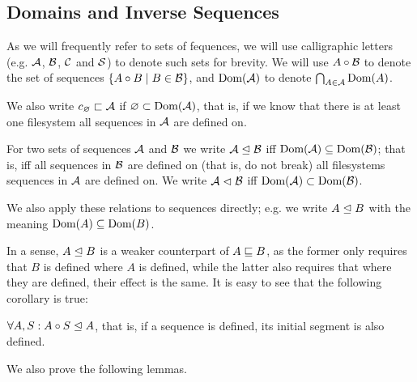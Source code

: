 

\subsection{Domains and Inverse Sequences}

\begin{mydef}
As we will frequently refer to sets of fequences,
we will use calligraphic letters (e.g. $\mathcal{A}$, $\mathcal{B}$, $\mathcal{C}$ and $\mathcal{S}$)
to denote such sets for brevity.
We will use $A\circ\mathcal{B}$ to denote the set of sequences $\{A\circ B\mathrel{|} B\in\mathcal{B}\}$,
and $\textrm{Dom}({\mathcal{A}})$ to denote $\bigcap_{A\in\mathcal{A}} \textrm{Dom}({A})$.

We also write $c_\varnothing\sqsubset{\mathcal{A}}$ if $\varnothing \subset \textrm{Dom}({\mathcal{A}})$, that is,
if we know that there is at least one filesystem
all sequences in $\mathcal{A}$ are defined on.
\end{mydef}


\begin{mydef}[$\worksmsign$, $\worksmeqsign$]\label{def_works}
For two sets of sequences $\mathcal{A}$ and $\mathcal{B}$
we write ${\mathcal{A}}\trianglelefteq{\mathcal{B}}$ iff $\textrm{Dom}({\mathcal{A}}) \subseteq \textrm{Dom}({\mathcal{B}})$;
that is, iff all sequences in $\mathcal{B}$ are defined on (that is, do not break)
all filesystems sequences in $\mathcal{A}$ are defined on.
We write ${\mathcal{A}}\vartriangleleft{\mathcal{B}}$ iff $\textrm{Dom}({\mathcal{A}}) \subset \textrm{Dom}({\mathcal{B}})$.

We also apply these relations to sequences directly;
e.g. we write
${A}\trianglelefteq{B}$ with the meaning $\textrm{Dom}({A}) \subseteq \textrm{Dom}({B})$.
\end{mydef}

In a sense, $A\trianglelefteq B$ is a weaker counterpart of $A\sqsubseteq B$, as the former
only requires that $B$ is defined where $A$ is defined, 
while the latter also requires
that where they are defined, their effect is the same.
It is easy to see that the following corollary is true:

\begin{mycor}\label{worksextpostfix}
$\forall A,S: {A\circ S}\trianglelefteq{A}$, that is, if a sequence is defined,
its initial segment is also defined.
\end{mycor}

We also prove the following lemmas.

